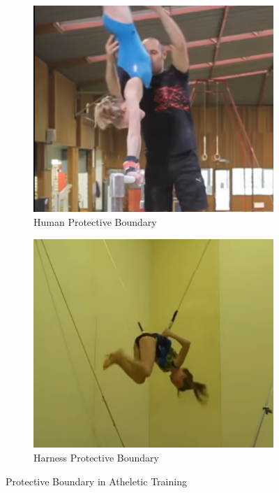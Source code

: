 \documentclass[journal]{IEEEtran}
\begin{document}
\begin{figure}
\centering
\begin{subfigure}{0.25\textwidth}
  \centering
  \includegraphics[width=\linewidth]{training1.png}
  \caption{Human Protective Boundary}
\end{subfigure}%
\begin{subfigure}{.25\textwidth}
  \centering
  \includegraphics[width=\linewidth]{training2.png}
  \caption{Harness Protective Boundary}
\end{subfigure}
\caption{Protective Boundary in Atheletic Training}
\label{fig:athelete}
\end{figure}
\end{document}
